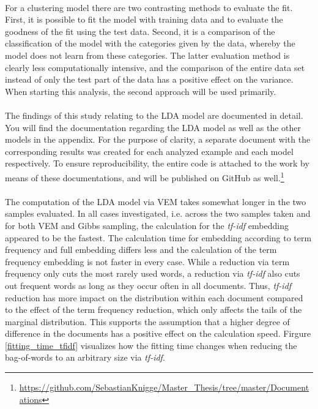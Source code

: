 \documentclass[11pt,a4paper]{article}
\begin{document}
\ \\
For a clustering model there are two contrasting methods to evaluate the fit. First, it is possible to fit the model with training data and to evaluate the goodness of the fit using the test data. Second, it is a comparison of the classification of the model with the categories given by the data, whereby the model does not learn from these categories. The latter evaluation method is clearly less computationally intensive, and the comparison of the entire data set instead of only the test part of the data has a positive effect on the variance. When starting this analysis, the second approach will be used primarily.\\
\ \\
The findings of this study relating to the LDA model are documented in detail. You will find the documentation regarding the LDA model as well as the other models in the appendix. For the purpose of clarity, a separate document with the corresponding results was created for each analyzed example and each model respectively. To ensure reproducibility, the entire code is attached to the work by means of these documentations, and will be published on GitHub as well.\footnote{\url{https://github.com/SebastianKnigge/Master_Thesis/tree/master/Documentations} }\\
\ \\
The computation of the LDA model via VEM takes somewhat longer in the two samples evaluated. In all cases investigated, i.e. across the two samples taken and for both VEM and Gibbs sampling, the calculation for the \textit{tf-idf} embedding appeared to be the fastest. The calculation time for embedding according to term frequency and full embedding differs less and the calculation of the term frequency embedding is not faster in every case. While a reduction via term frequency only cuts the most rarely used words, a reduction via \textit{tf-idf} also cuts out frequent words as long as they occur often in all documents. Thus, \textit{tf-idf} reduction has more impact on the distribution within each document compared to the effect of the term frequency reduction, which only affects the tails of the marginal distribution. This supports the assumption that a higher degree of difference in the documents has a positive effect on the calculation speed. Firgure \ref{fitting_time_tfidf} visualizes how the fitting time changes when reducing the bag-of-words to an arbitrary size via \textit{tf-idf}.\\
\end{document}
